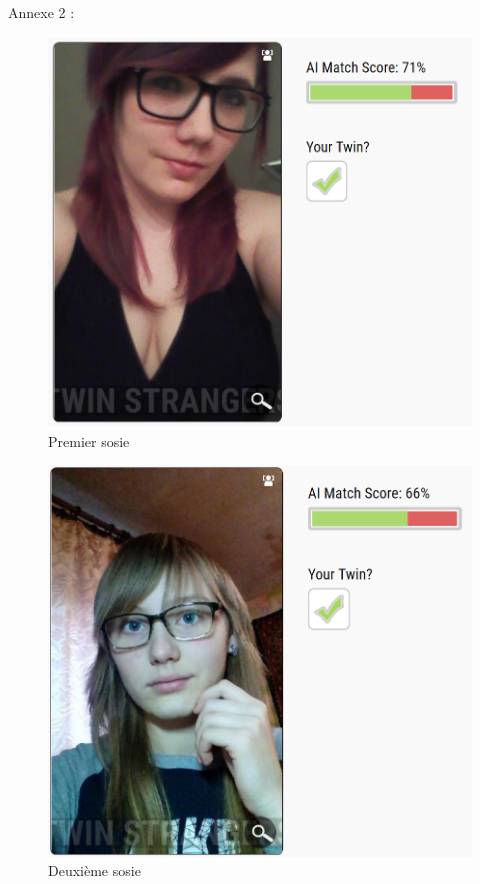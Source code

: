 \documentclass[a4paper,12pt]{article}
\begin{document}
Annexe 2 : 
\begin{figure}[!ht]
    \centering
        \includegraphics[scale=0.45]{images/ResS1.PNG}
        \caption{Premier sosie}
    \end{figure}
    \begin{figure}[!ht]
    \centering
        \includegraphics[scale=0.3]{images/ResS12.PNG}
        \caption{Deuxième sosie}
    \end{figure}
\end{document}
